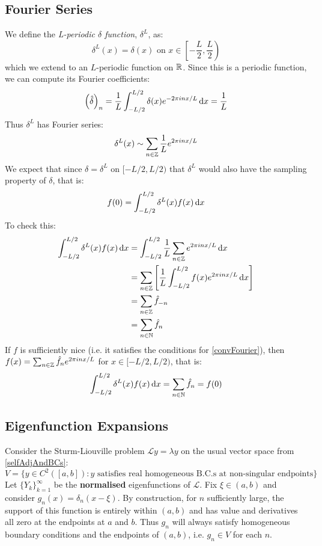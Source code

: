 \documentclass[../main.tex]{subfiles}
\begin{document}
\subsection{Fourier Series}
We define the \textit{L-periodic $\delta$ function}, $\delta^{L}$, as:
\[
  \delta^{L}(x) = \delta(x) \text{ on } x \in \left[-\frac{L}{2}, \frac{L}{2}\right)
\]
which we extend to an $L$-periodic function on $\mathbb{R}$.
Since this is a periodic function, we can compute its Fourier coefficients:
\[
  \left(\hat{\delta}\right)_n = \frac{1}{L} \int_{-L/2}^{L/2} \delta(x)e^{-2\pi i n x/L} \d{x} = \frac{1}{L}
\]
Thus $\delta^{L}$ has Fourier series:
\[
  \delta^{L}(x) \sim \sum_{n \in \mathbb{Z}} \frac{1}{L} e^{2\pi i n x/L}
\]
We expect that since $\delta = \delta^{L}$ on $[-L/2, L/2)$ that $\delta^{L}$ would also have the sampling property of $\delta$, that is:
\[
  f(0) = \int_{-L/2}^{L/2} \delta^{L}(x)f(x) \d{x}
\]
To check this:
\begin{align*}
  \int_{-L/2}^{L/2} \delta^{L}(x)f(x) \d{x} &= \int_{-L/2}^{L/2} \frac{1}{L} \sum_{n \in \Z} e^{2 \pi i n x/L} \d{x} \\
                                            &= \sum_{n \in \Z} \left[\frac{1}{L} \int_{-L/2}^{L/2} f(x) e^{2\pi i n x/L} \d{x}\right] \\
                                            &= \sum_{n \in \Z} \hat{f}_{-n} \\
                                            &= \sum_{n \in \N} \hat{f}_n
\end{align*}
If $f$ is sufficiently nice (i.e. it satisfies the conditions for \cref{convFourier}), then $f(x) = \sum_{n \in \mathbb{Z}} \hat{f}_n e^{2 \pi i n x/L}$ for $x \in [-L/2, L/2)$, that is:
\[
  \int_{-L/2}^{L/2} \delta^{L}(x)f(x) \d{x} = \sum_{n \in \N} \hat{f}_n = f(0)
\]
\subsection{Eigenfunction Expansions} \label{eigenFnExp}
Consider the Sturm-Liouville problem $\mathcal{L} y = \lambda y$ on the usual vector space from \cref{selfAdjAndBCs}:
\[
  V = \{y \in C^2([a, b]): \text{$y$ satisfies real homogeneous B.C.s at non-singular endpoints}\}
\]
Let $\{Y_k\}^{\infty}_{k = 1}$ be the \textbf{normalised} eigenfunctions of $\mathcal{L}$.
Fix $\xi \in (a, b)$ and consider $g_n(x) = \delta_n(x - \xi)$.
By construction, for $n$ sufficiently large, the support of this function is entirely within $(a, b)$ and has value and derivatives all zero at the endpoints at $a$ and $b$.
Thus $g_n$ will always satisfy homogeneous boundary conditions and the endpoints of $(a, b)$, i.e. $g_n \in V$ for each $n$.
\end{document}
